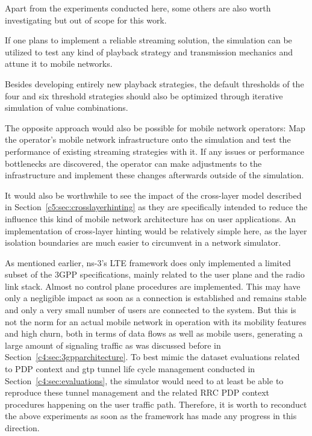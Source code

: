 {Apart from the experiments conducted here, some others are also worth investigating but out of scope for this work.

If one plans to implement a reliable streaming solution, the simulation can be utilized to test any kind of playback strategy and transmission mechanics and attune it to mobile networks. 

Besides developing entirely new playback strategies, the default thresholds of the four and six threshold strategies should also be optimized through iterative simulation of value combinations.

The opposite approach would also be possible for mobile network operators: Map the operator's mobile network infrastructure onto the simulation and test the performance of existing streaming strategies with it. If any issues or performance bottlenecks are discovered, the operator can make adjustments to the infrastructure and implement these changes afterwards outside of the simulation.

It would also be worthwhile to see the impact of the cross-layer model described in Section~\ref{c5:sec:crosslayerhinting} as they are specifically intended to reduce the influence this kind of mobile network architecture has on user applications. An implementation of cross-layer hinting would be relatively simple here, as the layer isolation boundaries are much easier to circumvent in a network simulator.

As mentioned earlier, ns-3's \gls{LTE} framework does only implemented a limited subset of the \gls{3GPP} specifications, mainly related to the user plane and the radio link stack. Almost no control plane procedures are implemented. This may have only a negligible impact as soon as a connection is established and remains stable and only a very small number of users are connected to the system. But this is not the norm for an actual mobile network in operation with its mobility features and high churn, both in terms of data flows as well as mobile users, generating a large amount of signaling traffic as was discussed before in Section~\ref{c4:sec:3gpparchitecture}. To best mimic the dataset evaluations related to \gls{PDP} context and \gls{gtp} tunnel life cycle management conducted in Section~\ref{c4:sec:evaluations}, the simulator would need to at least be able to reproduce these tunnel management and the related \gls{RRC} \gls{PDP} context procedures happening on the user traffic path. Therefore, it is worth to reconduct the above experiments as soon as the framework has made any progress in this direction.




}
